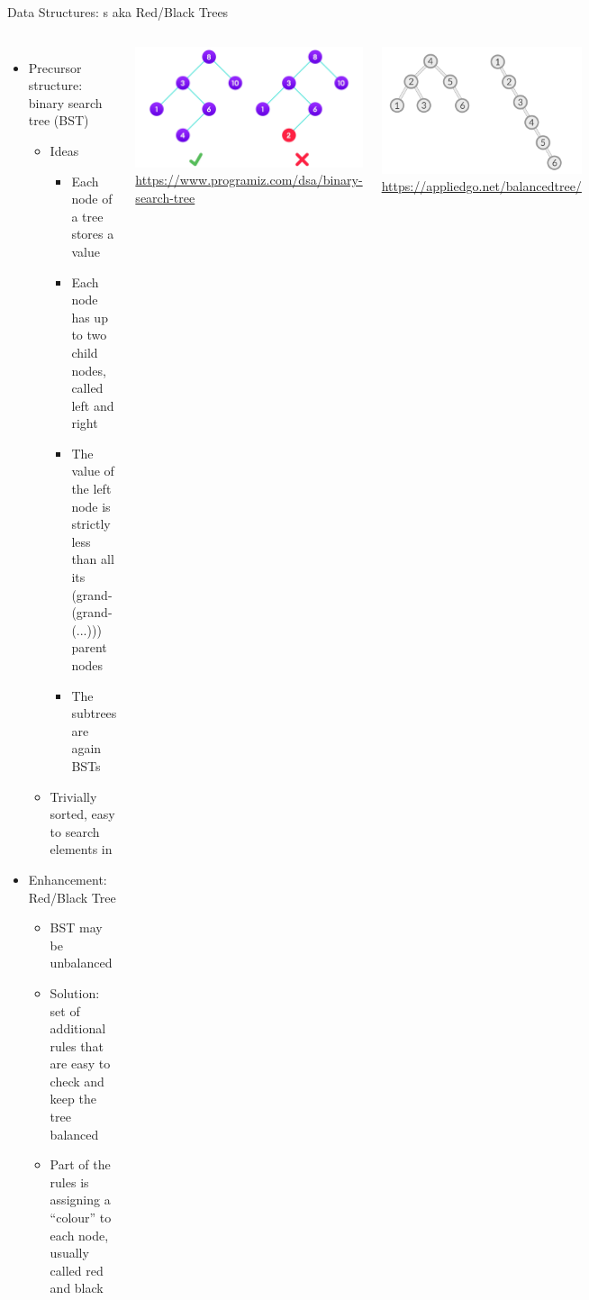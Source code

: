 \begin{frame}{Data Structures: s aka Red/Black Trees}
%
\begin{columns}[T]
\begin{itemize}
\item Precursor structure: binary search tree (BST)
	\begin{itemize}
	\item Ideas
		\begin{itemize}
		\item Each node of a tree stores a value
		\item Each node has up to two child nodes, called left and right
		\item The value of the left node is strictly less than all its (grand-(grand-(...))) parent nodes
		\item The subtrees are again BSTs
		\end{itemize}
	\item[\Thus] Trivially sorted, easy to search elements in
	\end{itemize}
\item Enhancement: Red/Black Tree
	\begin{itemize}
	\item BST may be unbalanced
	\item Solution: set of additional rules that are easy to check and keep the tree balanced
	\item Part of the rules is assigning a \enquote{colour} to each node, usually called red and black
	\end{itemize}
\end{itemize}
%
\includegraphics[width=.8\linewidth]{./gfx/05-bst}\\
{\tiny\url{https://www.programiz.com/dsa/binary-search-tree}}

\includegraphics[width=.8\linewidth]{./gfx/05-bst-balance}
{\tiny\url{https://appliedgo.net/balancedtree/}}
\end{columns}
%
\end{frame}

